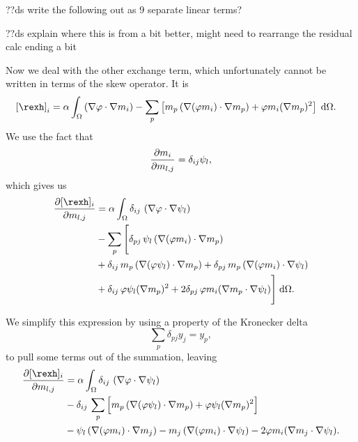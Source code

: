 ??ds write the following out as 9 separate linear terms?

??ds explain where this is from a bit better, might need to rearrange the residual calc ending a bit

Now we deal with the other exchange term, which unfortunately cannot be written in terms of the skew operator. It is
\begin{equation}
  \begin{aligned}
    \left[\rexh \right]_i &= \dampc \int_\magd
    \left(\nabla \tbf \cdot \nabla m_i \right)
    - \sum_p \left[ m_p
      \left(\nabla(\tbf m_i) \cdot \nabla m_p \right)
      + \tbf m_i (\nabla m_p)^2 \right] \d\magd.
  \end{aligned}
\end{equation}
We use the fact that
\begin{equation}
  \frac{\partial m_i}{\partial m_{l,j}} = \delta_{ij} \psi_l,
\end{equation}
which gives us
\begin{equation}
  \begin{aligned}
    \pd{[\rexh]_i}{m_{l,j}} &= \dampc \int_\magd
    \delta_{ij}\, \left(\nabla \tbf \cdot \nabla \sbf_l \right)
    \\
    &- \sum_p \Bigg[
       \delta_{pj}\, \sbf_l \left(\nabla(\tbf m_i) \cdot \nabla m_p \right)
       \\
       &+ \delta_{ij}\, m_p \left(\nabla(\tbf \sbf_l) \cdot \nabla m_p \right)
       + \delta_{pj}\, m_p \left(\nabla(\tbf m_i) \cdot \nabla \sbf_l \right)
       \\
       &+ \delta_{ij}\, \tbf \sbf_l (\nabla m_p)^2
       + 2 \delta_{pj}\, \tbf m_i (\nabla m_p \cdot \nabla \sbf_l)
      \Bigg]
    \d\magd.
  \end{aligned}
\end{equation}

We simplify this expression by using a property of the Kronecker delta
\begin{equation}
  \sum_p \delta_{pj} y_j = y_p,
\end{equation}
to pull some terms out of the summation, leaving
\begin{equation}
  \begin{aligned}
    \pd{[\rexh]_i}{m_{l,j}} &= \dampc \int_\magd
    \delta_{ij}\, \left(\nabla \tbf \cdot \nabla \sbf_l \right)
    \\
    &- \delta_{ij}\, \sum_p \Big[
      m_p \left(\nabla(\tbf \sbf_l) \cdot \nabla m_p \right)
      +\tbf \sbf_l (\nabla m_p)^2
      \Big]
    \\
    &- \sbf_l \left(\nabla(\tbf m_i) \cdot \nabla m_j \right)
    - m_j \left(\nabla(\tbf m_i) \cdot \nabla \sbf_l \right)
    - 2\tbf m_i (\nabla m_j \cdot \nabla \sbf_l).
  \end{aligned}
\end{equation}

